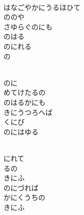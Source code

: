 \documentclass[10pt,b5j]{tarticle} %
\begin{document}
\vspace{1.5em} %
\newcommand{\linespace}{0.5em} %
\newcommand{\blocksize}{0.5\hsize} %
\newcommand{\itemmargin}{6em} %
\begin{enumerate} %
    \setlength{\itemindent}{\itemmargin} %
    \begin{minipage}[c]{\blocksize}
    
        \vspace{\linespace}
        \item~\\
        はなごやかにうるほひて\\
        ののや\\
        さゆらぐのにも\\
        のはる\\
        のにれる\\
        の
        
        \vspace{\linespace}
        \item~\\
        のに\\
        めてけたるの\\
        のはるかにも\\
        きにうつろへば\\
        くにび\\
        のにはゆる
        
        \vspace{\linespace}
        \item~\\
        にれて\\
        るの\\
        きにふ\\
        のにづれば\\
        かにくうちの\\
        きにふ
        

\end{minipage}
\end{enumerate}
\end{document}
